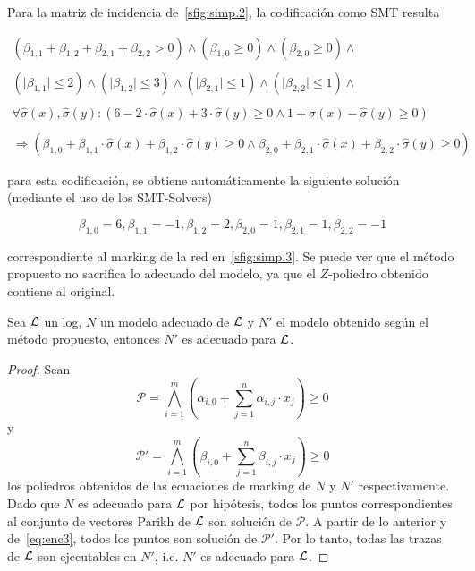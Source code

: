\begin{example}
Para la matriz de incidencia de~\autoref{sfig:simp.2}, la codificación como SMT resulta

$$\begin{array}{l}
{(\beta_{1,1} + \beta_{1,2} + \beta_{2,1} + \beta_{2,2} > 0)} \land
{(\beta_{1,0} \geq 0)} \land
{(\beta_{2,0} \geq 0)} \land \\ \\
{(\lvert \beta_{1,1} \rvert \leq 2)} \land
{(\lvert \beta_{1,2} \rvert \leq 3)} \land
{(\lvert \beta_{2,1} \rvert \leq 1)} \land
{(\lvert \beta_{2,2} \rvert \leq 1)} \land \\ \\
{\forall \widehat\sigma(x), \widehat\sigma(y) : (6 - 2 \cdot \widehat\sigma(x) + 3 \cdot \widehat\sigma(y) \ge 0 \land 1 + \widehat\sigma(x) - \widehat\sigma(y) \ge 0)} \\ \\
\Rightarrow (\beta_{1,0} + \beta_{1,1} \cdot \widehat\sigma(x) + \beta_{1,2 }\cdot  \widehat\sigma(y) \ge 0 \land \beta_{2,0} + \beta_{2,1} \cdot \widehat\sigma(x) + \beta_{2,2} \cdot  \widehat\sigma(y) \ge 0)
\end{array}$$

para esta codificación, se obtiene automáticamente la siguiente solución (mediante el uso de los SMT-Solvers)

$$\beta_{1,0}=6,\beta_{1,1}=-1,\beta_{1,2}=2, \beta_{2,0}=1,\beta_{2,1}=1,\beta_{2,2}=-1$$

correspondiente al marking de la red en~\autoref{sfig:simp.3}.
Se puede ver que el método propuesto no sacrifica lo adecuado del modelo, ya que el $Z$-poliedro obtenido
contiene al original.
\end{example}

\begin{theorem}
    \label{theo:fit}
    Sea ${\mathcal L}$ un log, $N$ un modelo adecuado de ${\mathcal L}$ y $N'$ el modelo obtenido según el método propuesto,
    entonces $N'$ es adecuado para ${\mathcal L}$.
\end{theorem}

\begin{proof}
    Sean $$\mathcal{P} = \bigwedge\limits_{i=1}^m (\alpha_{i,0} + \sum\limits_{j=1}^n \alpha_{i,j} \cdot x_j )\ge 0$$ y
    $$\mathcal{P}' = \bigwedge\limits_{i=1}^m (\beta_{i,0} + \sum\limits_{j=1}^n \beta_{i,j} \cdot x_j )\ge 0$$ los poliedros
    obtenidos de las ecuaciones de marking de $N$ y $N'$ respectivamente. Dado que $N$ es adecuado para ${\mathcal L}$ por hipótesis, 
    todos los puntos correspondientes al conjunto de vectores Parikh de ${\mathcal L}$ son solución de $\mathcal{P}$.
    A partir de lo anterior y de~\eqref{eq:enc3}, todos los puntos son solución de $\mathcal{P}'$.
    Por lo tanto, todas las trazas de ${\mathcal L}$ son ejecutables en $N'$, i.e. $N'$ es adecuado para ${\mathcal L}$.
\end{proof}

